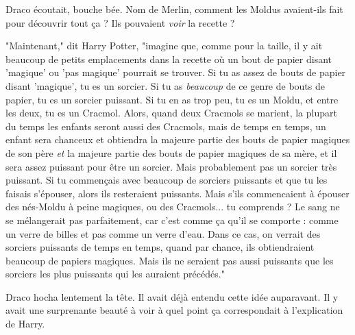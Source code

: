 Draco écoutait, bouche bée. Nom de Merlin, comment les Moldus avaient-ils fait pour découvrir tout ça ? Ils pouvaient \emph{voir}  la recette ?

"Maintenant," dit Harry Potter, "imagine que, comme pour la taille, il y ait beaucoup de petits emplacements dans la recette où un bout de papier disant 'magique' ou 'pas magique' pourrait se trouver. Si tu as assez de bouts de papier disant 'magique', tu es un sorcier. Si tu as \emph{beaucoup}  de ce genre de bouts de papier, tu es un sorcier puissant. Si tu en as trop peu, tu es un Moldu, et entre les deux, tu es un Cracmol. Alors, quand deux Cracmols se marient, la plupart du temps les enfants seront aussi des Cracmols, mais de temps en temps, un enfant sera chanceux et obtiendra la majeure partie des bouts de papier magiques de son père \emph{et}  la majeure partie des bouts de papier magiques de sa mère, et il sera assez puissant pour être un sorcier. Mais probablement pas un sorcier très puissant. Si tu commençais avec beaucoup de sorciers puissants et que tu les faisais s'épouser, alors ils resteraient puissants. Mais s'ils commencaient à épouser des nés-Moldu à peine magiques, ou des Cracmols... tu comprends ? Le sang ne se mélangerait pas parfaitement, car c'est comme ça qu'il se comporte : comme un verre de billes et pas comme un verre d'eau. Dans ce cas, on verrait des sorciers puissants de temps en temps, quand par chance, ils obtiendraient beaucoup de papiers magiques. Mais ils ne seraient pas aussi puissants que les sorciers les plus puissants qui les auraient précédés."

Draco hocha lentement la tête. Il avait déjà entendu cette idée auparavant. Il y avait une surprenante beauté à voir à quel point ça correspondait à l'explication de Harry.

